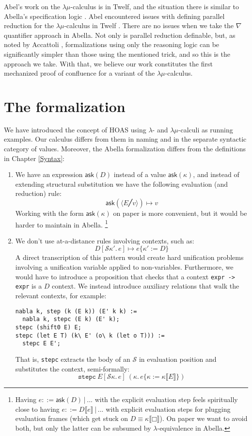 \documentclass[a4paper, 11pt,titlepage, openright, twoside]{report}
\newcommand{\Ask}{\textsf{ask}}
\newcommand{\subst}[2]{\{#1{:=}#2\}}
\renewcommand{\S}{\mathcal{S}}
\newcommand{\+}{\enspace}
\begin{document}
Abel's work on the $λμ$-calculus is in Twelf, and the situation there
is similar to Abella's specification logic%
.
Abel encountered issues with defining parallel reduction for the $λμ$-calculus in Twelf \cite{3rd}.
There are no issues when we take the $\nabla$ quantifier approach in Abella.
Not only is parallel reduction definable,
but, as noted by Accattoli \cite{pearl},
formalizations using only the reasoning logic
can be significantly simpler than those using the mentioned trick,
and so this is the approach we take.
With that, we believe our work constitutes the first mechanized proof of confluence for a variant of the $λμ$-calculus.

\section{The formalization}
We have introduced the concept of HOAS using $λ$- and $λμ$-calculi as running examples.
Our calculus differs from them in naming and in the separate syntactic category of values.
Moreover, the Abella formalization differs from the definitions in Chapter \ref{Syntax}:
\begin{enumerate}
	\item
		We have an expression $\Ask(D)$ instead of a value $\Ask(κ)$,
		and instead of extending structural substitution we have the following evaluation (and reduction) rule:
		$$\Ask(⟨E╱v⟩) ↦ v$$
		Working with the form $\Ask(κ)$ on paper is more convenient,
		but it would be harder to maintain in Abella.%
		\footnote{
			Having $e ::= \Ask(D) │ ...$ with the explicit evaluation step feels spiritually close
			to having $e ::= D⟦e⟧ │ ...$ with explicit evaluation steps for plugging evaluation frames
			(which get stuck on $D ≡ κ⟦□⟧$).
			On paper we want to avoid both, but only the latter can be subsumed by $λ$-equivalence in Abella.
		}
	\item
		We don't use at-a-distance rules involving contexts, such as:
		$$D[\S κ'.\,e] ↦ e\subst{κ'}{D}$$
		A direct transcription of this pattern would create hard unification problems
		involving a unification variable applied to non-variables.
		Furthermore, we would have to introduce a proposition that checks
		that a context \lstinline{expr -> expr} is a $D$ context.
		We instead introduce auxiliary relations that walk the relevant contexts, for example:
		\begin{lstlisting}
nabla k, step (k (E k)) (E' k k) :=
  nabla k, stepc (E k) (E' k);
stepc (shift0 E) E;
stepc (let E T) (k\ E' (o\ k (let o T))) :=
  stepc E E';
		\end{lstlisting}
		That is, \lstinline{stepc} extracts the body of an $\S$ in evaluation position and substitutes the context, semi-formally:
		$$\texttt{stepc}\:E[\S κ.\,e] \:(κ.\,e\subst{κ}{κ⟦E⟧})$$
\end{enumerate}
\end{document}
